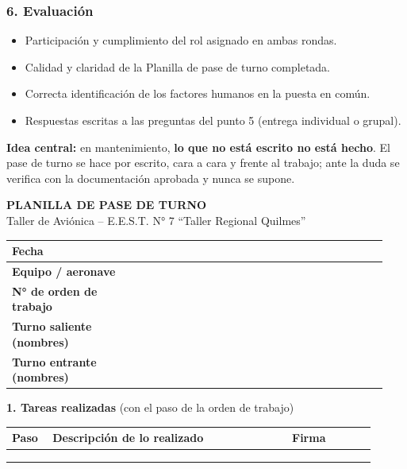 \subsubsection*{6. Evaluación}
\begin{itemize}
  \item Participación y cumplimiento del rol asignado en ambas rondas.
  \item Calidad y claridad de la Planilla de pase de turno completada.
  \item Correcta identificación de los factores humanos en la puesta en común.
  \item Respuestas escritas a las preguntas del punto 5 (entrega individual o grupal).
\end{itemize}

\begin{recuadro}
\textbf{Idea central:} en mantenimiento, \textbf{lo que no está escrito no está hecho}. El
pase de turno se hace por escrito, cara a cara y frente al trabajo; ante la duda se verifica
con la documentación aprobada y nunca se supone.
\end{recuadro}

\clearpage
\begin{center}
{\large\bfseries PLANILLA DE PASE DE TURNO}\\[2pt]
{\small Taller de Aviónica -- E.E.S.T. N° 7 ``Taller Regional Quilmes''}
\end{center}

\renewcommand{\arraystretch}{1.4}
\noindent
\begin{tabular}{|>{\raggedright\arraybackslash}p{0.34\linewidth}|p{0.595\linewidth}|}
\hline
\textbf{Fecha} & \\ \hline
\textbf{Equipo / aeronave} & \\ \hline
\textbf{N° de orden de trabajo} & \\ \hline
\textbf{Turno saliente (nombres)} & \\ \hline
\textbf{Turno entrante (nombres)} & \\ \hline
\end{tabular}

\vspace{5pt}
\noindent\textbf{1. Tareas realizadas} (con el paso de la orden de trabajo)\\[2pt]
\begin{tabular}{|p{0.10\linewidth}|p{0.60\linewidth}|p{0.215\linewidth}|}
\hline
\textbf{Paso} & \textbf{Descripción de lo realizado} & \textbf{Firma} \\ \hline
 & & \\ \hline
 & & \\ \hline
 & & \\ \hline
\end{tabular}

